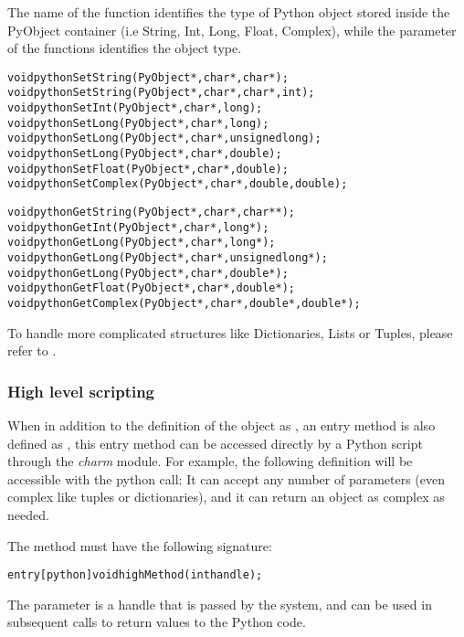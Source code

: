 The name of the function identifies the type of Python object stored inside the
PyObject container (i.e String, Int, Long, Float, Complex), while the parameter
of the functions identifies the \CC object type.

\begin{alltt}
void pythonSetString(PyObject*, char*, char*);
void pythonSetString(PyObject*, char*, char*, int);
void pythonSetInt(PyObject*, char*, long);
void pythonSetLong(PyObject*, char*, long);
void pythonSetLong(PyObject*, char*, unsigned long);
void pythonSetLong(PyObject*, char*, double);
void pythonSetFloat(PyObject*, char*, double);
void pythonSetComplex(PyObject*, char*, double, double);

void pythonGetString(PyObject*, char*, char**);
void pythonGetInt(PyObject*, char*, long*);
void pythonGetLong(PyObject*, char*, long*);
void pythonGetLong(PyObject*, char*, unsigned long*);
void pythonGetLong(PyObject*, char*, double*);
void pythonGetFloat(PyObject*, char*, double*);
void pythonGetComplex(PyObject*, char*, double*, double*);
\end{alltt}

To handle more complicated structures like Dictionaries, Lists or Tuples, please refer to .

\subsubsection{High level scripting}

\label{pythonHighLevel}

When in addition to the definition of the \charmpp{} object as , an
entry method is also defined as , this entry method can be accessed
directly by a Python script through the {\em charm} module. For example, the
following definition will be accessible with the python call:
It can accept any number of parameters (even complex like tuples or
dictionaries), and it can return an object as complex as needed.

The method must have the following signature:

\begin{alltt}
entry [python] void highMethod(int handle);
\end{alltt}

The parameter is a handle that is passed by the system, and can be used in
subsequent calls to return values to the Python code. %

